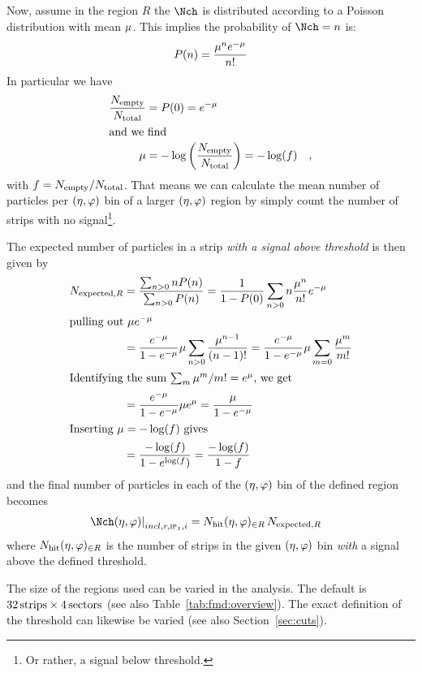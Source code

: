 \documentclass[compat,11pt]{alicenote}
\newcommand\mult[1][]{\Nch\ifx|#1|\relax\else_{#1}\fi}
\newcommand*{\etaphi}{\ensuremath(\eta,\varphi)}
\newcommand{\secref}[1]{Section~\ref{#1}}
\newcommand{\tabref}[1]{Table~\ref{#1}}
\newcommand{\dndetadphi}[1][]{{\ensuremath%
    \ifx|#1|\else\left.\fi%
      \Nch\etaphi%
      \ifx|#1|\else\right|_{#1}\fi}}
\newcommand\Ntotal{{\ensuremath N_{\text{total}}}}
\newcommand\Nempty{{\ensuremath N_{\text{empty}}}}
\newcommand\Nhit{{\ensuremath N_{\text{hit}}\etaphi_{\in R}}}
\begin{document}
Now, assume in the region $R$ the $\mult$ is distributed according to
a Poisson distribution with mean $\mu$.  This implies the
probability of $\mult=n$ is:
\begin{equation}
  P(n) = \frac{\mu^n e^{-\mu}}{n!} \label{eq:PoissonDef}
\end{equation}
In particular we have 
\begin{align*}
  \frac{\Nempty{}}{\Ntotal{}} &=   P(0) = e^{-\muR} \\
\intertext{and we find}
   \muR &= -\log\left(\frac{\Nempty{}}{\Ntotal{}}\right) = -\log(f)\quad,
\end{align*}
with $f=\Nempty{}/\Ntotal{}$.  That means we can calculate the mean
number of particles per $\etaphi$ bin of a larger $\etaphi$ region by
simply count the number of strips with no signal\footnote{Or rather, a
  signal below threshold.}.

The expected number of particles in a strip \emph{with a signal above
  threshold} is then given by
\begin{align}
  N_{\text{expected},R} &= \frac{\sum_{n>0}nP(n)}{\sum_{n>0}P(n)} 
  =  \frac1{1-P(0)}\sum_{n>0}n\frac{\mu^n}{n!}e^{-\mu} \nonumber\\
  \intertext{pulling out $\mu e^{-\mu}$}\nonumber
  &= \frac{e^{-\mu}}{1-e^{-\mu}}\mu\sum_{n>0}\frac{\mu^{n-1}}{(n-1)!} 
  =
  \frac{e^{-\mu}}{1-e^{-\mu}}\mu\sum_{m=0}\frac{\mu^m}{m!}\\
  \intertext{Identifying the sum $\sum_m\mu^m/m! = e^{\mu}$, we get}\nonumber
  &= \frac{e^{-\mu}}{1-e^{-\mu}}\mu e^{\mu}  = 
  \frac{\mu}{1-e^{-\mu}}\nonumber\\
  \intertext{Inserting $\mu=-\log(f)$ gives}\nonumber
  &=
  \frac{-\log(f)}{1-e^{\log(f})}
   =  \frac{-\log(f)}{1-f}
\end{align}
and the final number of particles in each of the $\etaphi$ bin of the
defined region becomes 
\begin{align}
  \label{eq:density2}
  \dndetadphi[incl,r,\subIPz,i] &= \Nhit{}\,N_{\text{expected},R} 
\end{align}
where $\Nhit{}$ is the number of strips in the given $\etaphi$ bin
\emph{with} a signal above the defined threshold.

The size of the regions used can be varied in the analysis.  The
default is $\unit[32]{strips}\times\unit[4]{sectors}$ (see also
\tabref{tab:fmd:overview}).  The exact definition of the threshold can
likewise be varied (see also \secref{sec:cuts}). 
\end{document}
